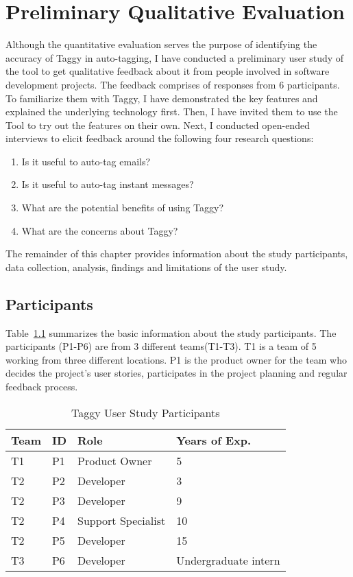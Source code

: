 \fancyhead[RO,LE]{\thepage}
\fancyfoot{} 
\chapter{Preliminary Qualitative Evaluation}
Although the quantitative evaluation serves the purpose of identifying the accuracy of Taggy in auto-tagging, I have conducted a preliminary user study of the tool to get qualitative feedback about it from people involved in software development projects. The feedback comprises of responses from 6 participants. To familiarize them with Taggy, I have demonstrated the key features and explained the underlying technology first. Then, I have invited them to use the Tool to try out the features on their own. Next, I conducted open-ended interviews to elicit feedback around the following four research questions:

\begin{enumerate}
	\item Is it useful to auto-tag emails?
	\item Is it useful to auto-tag instant messages?
	\item What are the potential benefits of using Taggy?
	\item What are the concerns about Taggy?
\end{enumerate}

The remainder of this chapter provides information about the study participants, data collection, analysis, findings and limitations of the user study.

\section{Participants}
Table~\ref{tab:participants} summarizes the basic information about the study participants. The participants (P1-P6) are from 3 different teams(T1-T3). T1 is a team of 5 working from three different locations. P1 is the product owner for the team who decides the project's user stories, participates in the project planning and regular feedback process. 

\begin{table}
	\label{tab:participants}
  \centering
  \caption{Taggy User Study Participants}
    \begin{tabular}{|p{2cm}|p{2cm}|p{4cm}|p{4cm}|}
    \hline
		Team & ID & Role & Years of Exp.\\
		\hline
		T1	&  P1 & Product Owner & 5 \\
		T2	&  P2 & Developer & 3 \\
		T2	&  P3 & Developer & 9 \\
		T2	&  P4 & Support Specialist & 10 \\
		T2	&  P5 & Developer & 15\\		
		T3	&  P6 & Developer & Undergraduate intern\\		
		\hline
		\end{tabular}
\end{table}                                              


